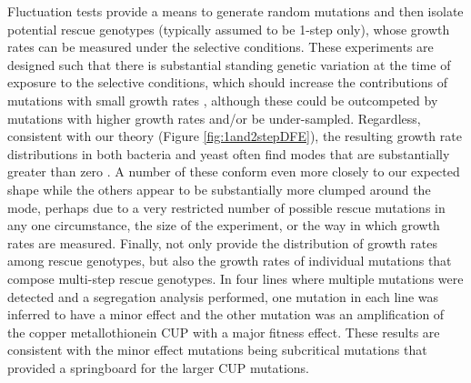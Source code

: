 \documentclass[9pt,twocolumn,twoside,lineno]{gsajnl}
\begin{document}
Fluctuation tests \citep{luria1943mutations} provide a means to generate random mutations and then isolate potential rescue genotypes (typically assumed to be 1-step only), whose growth rates can be measured under the selective conditions.
These experiments are designed such that there is substantial standing genetic variation at the time of exposure to the selective conditions, which should increase the contributions of mutations with small growth rates \citep{orr2001haldane}, although these could be outcompeted by mutations with higher growth rates and/or be under-sampled.
Regardless, consistent with our theory (Figure \ref{fig:1and2stepDFE}), the resulting growth rate distributions in both bacteria and yeast often find modes that are substantially greater than zero \citep[as opposed to, say, an exponential distribution;][]{Kassen2006,MacLean2009,Gerstein2012,Lindsey2013,Gerstein2015}.
A number of these conform even more closely to our expected shape \citep{Kassen2006,Gerstein2015} while the others appear to be substantially more clumped around the mode, perhaps due to a very restricted number of possible rescue mutations in any one circumstance, the size of the experiment, or the way in which growth rates are measured.
Finally, \cite{Gerstein2015} not only provide the distribution of growth rates among rescue genotypes, but also the growth rates of individual mutations that compose multi-step rescue genotypes.
In four lines where multiple mutations were detected and a segregation analysis performed, one mutation in each line was inferred to have a minor effect and the other mutation was an amplification of the copper metallothionein CUP with a major fitness effect. 
These results are  consistent with the minor effect mutations being subcritical mutations that provided a springboard for the larger CUP mutations.
\end{document}
